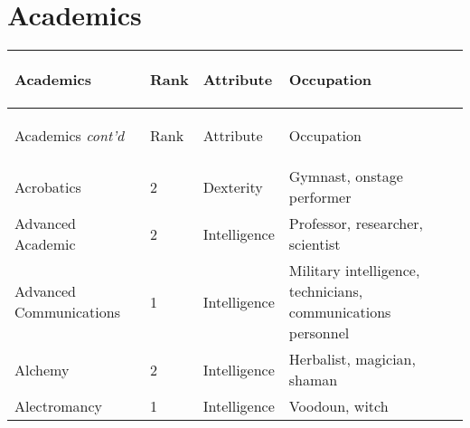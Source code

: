 \documentclass[twoside]{book}
\begin{document}
    

\chapter{Academics}
    
\begin{longtable}{p{1.25in}llp{12em}} 
  Academics
  &
  \begin{turn}{70}{Rank}\end{turn}
          
  &
  \begin{turn}{70}{Attribute}\end{turn}
          
  &
  \begin{turn}{70}{Occupation}\end{turn}
          
  \\
  \hline
  \hline
  \endfirsthead
  Academics \textit{cont'd}
        
  &
  \begin{turn}{70}{Rank}\end{turn}
          
  &
  \begin{turn}{70}{Attribute}\end{turn}
          
  &
  \begin{turn}{70}{Occupation}\end{turn}
          
  \\
  \hline
  \endhead
      
  \raggedright
           Acrobatics 
  &
   2 
  &
   Dexterity 
  &
   Gymnast, onstage
           performer 
  \tabularnewline
      
  \raggedright
           Advanced Academic 
  &
   2 
  &
   Intelligence 
  &
   Professor, researcher,
           scientist 
  \tabularnewline
      
  \raggedright
           Advanced Communications
           
  &
   1 
  &
   Intelligence 
  &
   Military intelligence,
           technicians, communications personnel 
  \tabularnewline
      
  \raggedright
           Alchemy 
  &
   2 
  &
   Intelligence 
  &
   Herbalist, magician,
           shaman 
  \tabularnewline
      
  \raggedright
           Alectromancy 
  &
   1 
  &
   Intelligence 
  &
   Voodoun, witch 
  \tabularnewline
      

\end{longtable}
\end{document}
